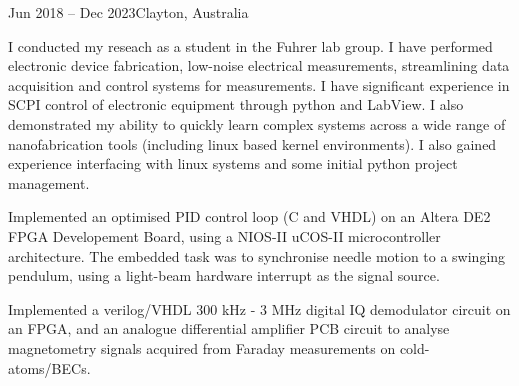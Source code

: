 \documentclass[10pt,a4paper,ragged2e,withhyper]{altacv}
\begin{document}
		{Jun 2018 -- Dec 2023}{Clayton, Australia}

		I conducted my reseach as a student in the Fuhrer lab group. I have performed electronic device fabrication, low-noise electrical measurements, streamlining data acquisition and control systems for measurements. 		I have significant experience in SCPI control of electronic equipment through python and LabView. I also demonstrated my ability to quickly learn complex systems across a wide range of nanofabrication tools (including linux based kernel environments). I also gained experience interfacing with linux systems and some initial python project management.

		\divider


		Implemented an optimised PID control loop (C and VHDL) on an Altera DE2 FPGA Developement Board, using a NIOS-II uCOS-II microcontroller architecture. 
		The embedded task was to synchronise needle motion to a swinging pendulum, using a light-beam hardware interrupt as the signal source.

		\divider
		
		Implemented a verilog/VHDL 300 kHz - 3 MHz digital IQ demodulator circuit on an FPGA, and an analogue differential amplifier PCB circuit
		to analyse magnetometry signals acquired from Faraday measurements on cold-atoms/BECs.
\end{document}
